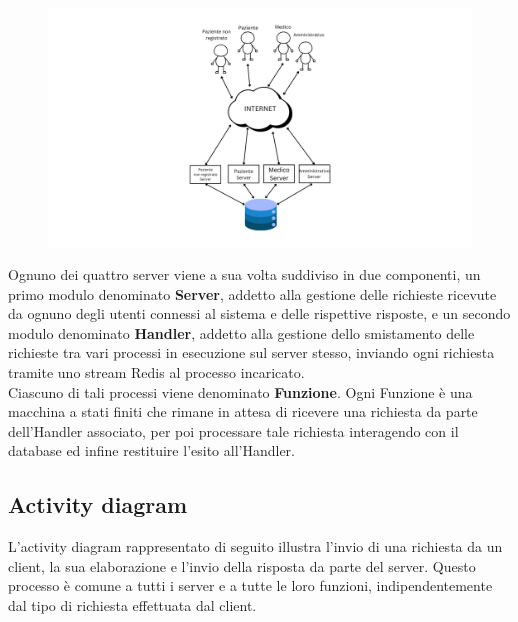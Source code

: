 \documentclass[12pt]{report}
\begin{document}
    \begin{figure}[H]
        \centering 
        \includegraphics[width=1
        \linewidth]{images/Architettura.png}
        \label{Architettura}
    \end{figure}
    Ognuno dei quattro server viene a sua volta suddiviso in due componenti, un primo modulo denominato \textbf{Server}, addetto alla gestione delle richieste ricevute da ognuno degli utenti connessi al sistema e delle rispettive risposte, e un secondo modulo denominato \textbf{Handler}, addetto alla gestione dello smistamento delle richieste tra vari processi in esecuzione sul server stesso, inviando ogni richiesta tramite uno stream Redis al processo incaricato.\\ 
    Ciascuno di tali processi viene denominato \textbf{Funzione}. Ogni Funzione è una macchina a stati finiti che rimane in attesa di ricevere una richiesta da parte dell'Handler associato, per poi processare tale richiesta interagendo con il database ed infine restituire l'esito all'Handler.

    \subsection{Activity diagram}
    L'activity diagram rappresentato di seguito illustra l'invio di una richiesta da un client, la sua elaborazione e l'invio della risposta da parte del server. Questo processo è comune a tutti i server e a tutte le loro funzioni, indipendentemente dal tipo di richiesta effettuata dal client.
\end{document}
